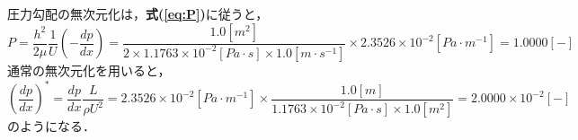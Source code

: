 圧力勾配の無次元化は，\textbf{式(\ref{eq:P})}に従うと，
\[
P=\frac{h^2}{2\mu}\frac{1}{U}\left(-\frac{dp}{dx}\right)
  =\frac{1.0[m^2]}{2\times 1.1763\times10^{-2}[Pa\cdot s]\times 1.0[m \cdot s^{-1}]}\times 2.3526 \times 10^{-2}[Pa\cdot m^{-1}]
=1.0000[-]
\]
通常の無次元化を用いると，
\[
\left(\frac{dp}{dx}\right)^*=\frac{dp}{dx}\frac{L}{\rho U^2}
=2.3526 \times 10^{-2}[Pa\cdot m^{-1}]\times 
\frac{1.0[m]}{1.1763 \times 10^{-2}[Pa\cdot s] \times 1.0[m^2]}
=2.0000\times 10^{-2}[-]
\]
のようになる．


